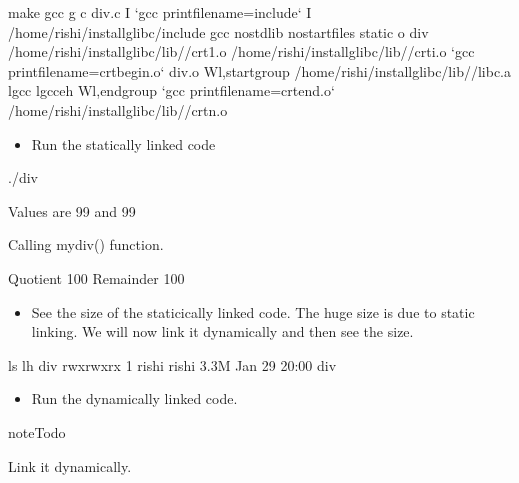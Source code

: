 \documentclass[letterpaper,10pt,english]{sphinxmanual}
\begin{document}
\begin{sphinxVerbatim}[commandchars=\\\{\}]
\PYGZdl{} make
gcc \PYGZhy{}g \PYGZhy{}c div.c \PYGZhy{}I {}`gcc \PYGZhy{}\PYGZhy{}print\PYGZhy{}file\PYGZhy{}name=include{}` \PYGZhy{}I /home/rishi/install\PYGZus{}glibc/include
gcc \PYGZhy{}nostdlib \PYGZhy{}nostartfiles \PYGZhy{}static \PYGZhy{}o div /home/rishi/install\PYGZus{}glibc/lib//crt1.o /home/rishi/install\PYGZus{}glibc/lib//crti.o {}`gcc \PYGZhy{}\PYGZhy{}print\PYGZhy{}file\PYGZhy{}name=crtbegin.o{}` div.o \PYGZhy{}Wl,\PYGZhy{}\PYGZhy{}start\PYGZhy{}group /home/rishi/install\PYGZus{}glibc/lib//libc.a \PYGZhy{}lgcc \PYGZhy{}lgcc\PYGZus{}eh \PYGZhy{}Wl,\PYGZhy{}\PYGZhy{}end\PYGZhy{}group {}`gcc \PYGZhy{}\PYGZhy{}print\PYGZhy{}file\PYGZhy{}name=crtend.o{}` /home/rishi/install\PYGZus{}glibc/lib//crtn.o
\end{sphinxVerbatim}
\begin{itemize}
\item {} 
Run the statically linked code

\end{itemize}

\begin{sphinxVerbatim}[commandchars=\\\{\}]
\PYGZdl{} ./div

Values are 99 and 99

Calling my\PYGZus{}div() function.

Quotient 100 Remainder 100
\end{sphinxVerbatim}
\begin{itemize}
\item {} 
See the size of the staticically linked code. The huge size is due to static linking. We will now link it dynamically and then see the size.

\end{itemize}

\begin{sphinxVerbatim}[commandchars=\\\{\}]
\PYGZdl{} ls \PYGZhy{}lh div
\PYGZhy{}rwxrwxr\PYGZhy{}x 1 rishi rishi 3.3M Jan 29 20:00 div
\end{sphinxVerbatim}
\begin{itemize}
\item {} 
Run the dynamically linked code.

\end{itemize}

\begin{sphinxadmonition}{note}{Todo}

Link it dynamically.
\end{sphinxadmonition}
\end{document}
